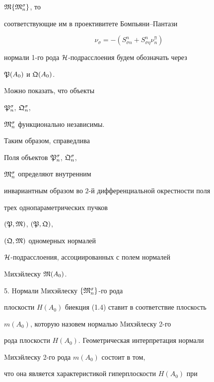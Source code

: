 $\frak M \{\frak M^\sigma_n \}$, то


соответствующие им в проективитете Бом\-пья\-ни--Пантази


\cite{rab3}


\begin{equation}


\nu_\sigma = -(S^n_{\sigma n} + S^n_{\sigma \eta} \nu^\eta_n)


\end{equation}


нормали 1-го рода $\cal H$-подрасслоения будем обозначать через


$\frak P (A_0)$ и $\frak Q (A_0)$.


Mожно показать, что объекты


$\frak P^\sigma_n$, $\frak Q^\sigma_n$,


$\frak M^\sigma_n$ функционально независимы.


Таким образом, справедлива





\begin{thm}


Поля объектов $\frak P^\sigma_n$, $\frak Q^\sigma_n$,


$\frak M^\sigma_n$ определяют внутренним


инвариантным образом во $2$-й дифференциальной окрестности поля


трех однопараметрических пучков


$(\frak P, \frak M)$, $(\frak P,\frak Q)$,


$(\frak Q, \frak M)$ одномерных нормалей


$\cal H$-подрасслоения, ассоциированных с полем нормалей


Mихэйлеску $\frak M (A_0)$.


\end{thm}





5. Hормали Mихэйлеску $\{\frak M^\sigma_n\}$-го рода


плоскости $H(A_0)$ биекция (1.4) ставит в соответствие плоскость


$m(A_0)$, которую назовем нормалью Mихэйлеску 2-го


рода плоскости $H(A_0)$. Геометрическая интерпретация нормали


Mихэйлеску 2-го рода $m(A_0)$ состоит в том,


что она является характеристикой гиперплоскости $H(A_0)$ при


